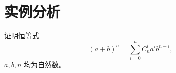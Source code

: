 \section{实例分析}









\begin{example}
  证明恒等式 \[(a + b)^n = \sum_{i=0}^n C_n^i a^i b^{n-i},\]\(a, b, n\) 均为自然数。
\end{example}

